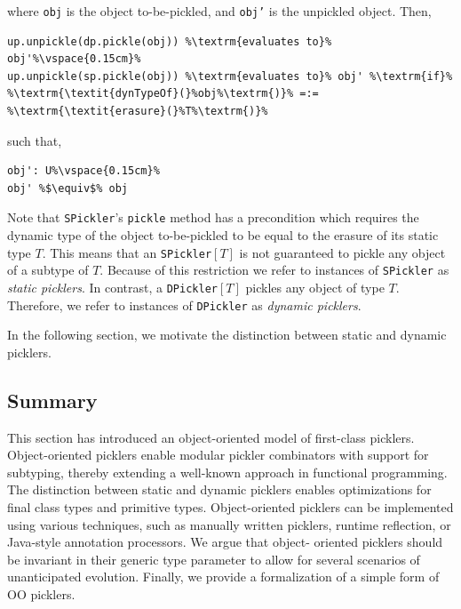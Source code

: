 \documentclass[10pt]{sigplanconf}
\theoremstyle{definition}
\theoremstyle{definition}
\newcommand{\term}[1]{\mbox{\texttt{#1}}}
\begin{document}
{\begin{defn}
\noindent where \term{obj} is the object to-be-pickled, and \term{obj'} is the unpickled
object. Then,

\begin{lstlisting}[escapechar=\%]
up.unpickle(dp.pickle(obj)) %\textrm{evaluates to}% obj'%\vspace{0.15cm}%
up.unpickle(sp.pickle(obj)) %\textrm{evaluates to}% obj' %\textrm{if}% %\textrm{\textit{dynTypeOf}(}%obj%\textrm{)}% =:= %\textrm{\textit{erasure}(}%T%\textrm{)}%
\end{lstlisting}

\noindent such that,

\begin{lstlisting}[escapechar=\%]
obj': U%\vspace{0.15cm}%
obj' %$\equiv$% obj
\end{lstlisting}
\end{defn}

Note that \term{SPickler}'s \term{pickle} method has a precondition which
requires the dynamic type of the object to-be-pickled to be equal to the
erasure of its static type $T$. This means that an \term{SPickler}$[T]$ is not
guaranteed to pickle any object of a subtype of $T$. Because of this
restriction we refer to instances of \term{SPickler} as {\em static picklers}.
In contrast, a \term{DPickler}$[T]$ pickles any object of type $T$. Therefore,
we refer to instances of \term{DPickler} as {\em dynamic picklers}.

In the following section, we motivate the distinction between static and
dynamic picklers.

}

\subsection{Summary}

This section has introduced an object-oriented model of first-class picklers.
Object-oriented picklers enable modular pickler combinators with support for
subtyping, thereby extending a well-known approach in functional programming.
The distinction between static and dynamic picklers enables optimizations for
final class types and primitive types. Object-oriented picklers can be
implemented using various techniques, such as manually written picklers,
runtime reflection, or Java-style annotation processors. We argue that object-
oriented picklers should be invariant in their generic type parameter to allow
for several scenarios of unanticipated evolution. Finally, we provide a
formalization of a simple form of OO picklers.
\end{document}
